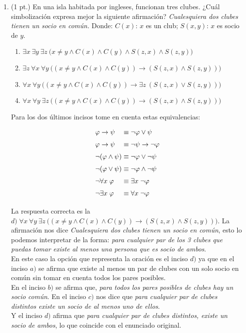 \documentclass[12pt,letterpaper]{article}
\newcommand{\imp}{\rightarrow}
\newcommand{\vp}{\varphi}
\begin{document}
\begin{enumerate}
    \item (1 pt.) En una isla habitada por ingleses, funcionan tres clubes. ¿Cuál simbolización expresa mejor la siguiente afirmación? {\it Cualesquiera dos clubes tienen un socio en común.} Donde: $C(x)$: $x$ es un club; $S(x,y)$: $x$ es socio de $y$.
      \begin{enumerate}[label=\alph*)]
         \item $\exists x\  \exists y\ \exists z\ \big(x\neq y \wedge C(x) \wedge C(y) \wedge S(z,x) \wedge S(z,y)\big)$
	 \item $\exists z\ \forall x\  \forall y\ \big((x\neq y \wedge C(x) \wedge C(y)) \imp (S(z,x) \wedge S(z,y))\big)$
	 \item $\forall x\  \forall y\ \big((x\neq y \wedge C(x) \wedge C(y)) \imp \exists z\ (S(z,x) \vee S(z,y))\big)$
	 \item $\forall x\  \forall y\ \exists z\ \big((x\neq y \wedge C(x) \wedge C(y)) \imp (S(z,x) \wedge S(z,y))\big)$
      \end{enumerate}
      
      Para los dos últimos incisos tome en cuenta estas equivalencias:
      \[\arraycolsep=1.4pt\def\arraystretch{1.5}
      \begin{array}{lcl}
        \vp \imp \psi &\equiv& \neg\vp \vee\psi\\
        \vp \imp \psi &\equiv& \neg\psi \imp \neg\vp\\
        \neg(\vp\wedge\psi) &\equiv& \neg\vp\vee\neg\psi\\
        \neg(\vp\vee\psi) &\equiv& \neg\vp\wedge\neg\psi\\
        \neg\forall x\;\vp &\equiv& \exists x\;\neg\vp\\
        \neg\exists x\;\vp &\equiv& \forall x\;\neg\vp
      \end{array}
      \]

      \bigskip
      La respuesta correcta es la $d)\; \forall x\  \forall y\ \exists z\ \big((x\neq y \wedge C(x) \wedge C(y)) \imp (S(z,x) \wedge S(z,y))\big)$.
      La afirmación nos dice {\it Cualesquiera dos clubes tienen un socio en común}, esto lo podemos interpretar de la forma: {\it para cualquier par de los 3 clubes que puedas tomar existe al menos una persona que es socio de ambos}.\\
      En este caso la opción que representa la oración es el inciso $d)$ ya que en el inciso $a)$ se afirma que existe al menos un par de clubes con un solo socio en común sin tomar en cuenta todos los pares posibles.\\
      En el inciso $b)$ se afirma que, {\it para todos los pares posibles de clubes hay un socio común}.
      En el inciso $c)$ nos dice que {\it para cualquier par de clubes distintos existe un socio de al menos uno de ellos}.\\
      Y el inciso $d)$ afirma que {\it para cualquier par de clubes distintos, existe un socio de ambos}, lo que coincide con el enunciado original.
      
\end{enumerate}
\end{document}
